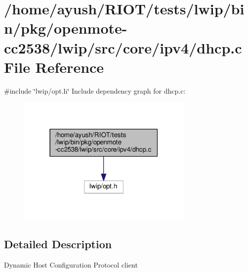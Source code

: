 \hypertarget{openmote-cc2538_2lwip_2src_2core_2ipv4_2dhcp_8c}{}\section{/home/ayush/\+R\+I\+O\+T/tests/lwip/bin/pkg/openmote-\/cc2538/lwip/src/core/ipv4/dhcp.c File Reference}
\label{openmote-cc2538_2lwip_2src_2core_2ipv4_2dhcp_8c}
{\ttfamily \#include \char`\"{}lwip/opt.\+h\char`\"{}}\newline
Include dependency graph for dhcp.\+c\+:
\nopagebreak
\begin{figure}[H]
\begin{center}
\leavevmode
\includegraphics[width=243pt]{openmote-cc2538_2lwip_2src_2core_2ipv4_2dhcp_8c__incl}
\end{center}
\end{figure}


\subsection{Detailed Description}
Dynamic Host Configuration Protocol client 